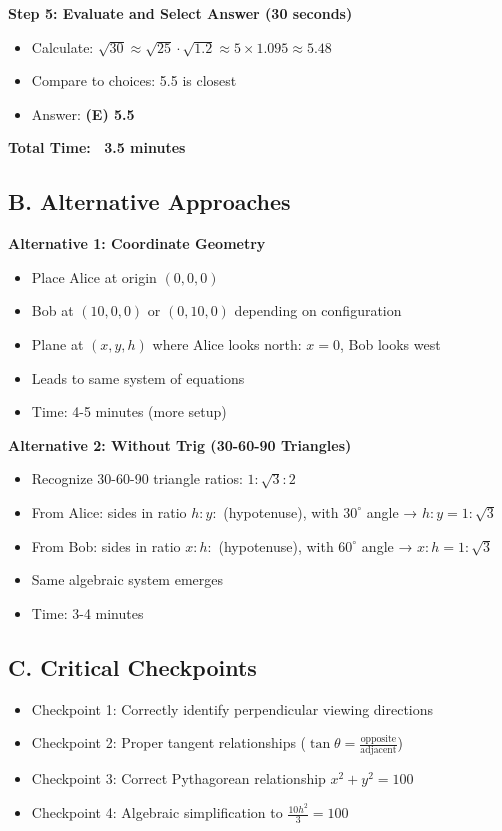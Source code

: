\documentclass[12pt]{article}
\begin{document}
\begin{roadmapbox}
\textbf{Step 5: Evaluate and Select Answer (30 seconds)}
\begin{itemize}[leftmargin=*]
    \item Calculate: $\sqrt{30} \approx \sqrt{25} \cdot \sqrt{1.2} \approx 5 \times 1.095 \approx 5.48$
    \item Compare to choices: 5.5 is closest
    \item Answer: \textbf{(E) 5.5}
\end{itemize}

\textbf{Total Time: ~3.5 minutes}

\subsection*{B. Alternative Approaches}

\textbf{Alternative 1: Coordinate Geometry}
\begin{itemize}[leftmargin=*]
    \item Place Alice at origin $(0, 0, 0)$
    \item Bob at $(10, 0, 0)$ or $(0, 10, 0)$ depending on configuration
    \item Plane at $(x, y, h)$ where Alice looks north: $x = 0$, Bob looks west
    \item Leads to same system of equations
    \item Time: 4-5 minutes (more setup)
\end{itemize}

\textbf{Alternative 2: Without Trig (30-60-90 Triangles)}
\begin{itemize}[leftmargin=*]
    \item Recognize 30-60-90 triangle ratios: $1:\sqrt{3}:2$
    \item From Alice: sides in ratio $h:y:$ (hypotenuse), with $30^\circ$ angle → $h:y = 1:\sqrt{3}$
    \item From Bob: sides in ratio $x:h:$ (hypotenuse), with $60^\circ$ angle → $x:h = 1:\sqrt{3}$
    \item Same algebraic system emerges
    \item Time: 3-4 minutes
\end{itemize}

\subsection*{C. Critical Checkpoints}
\begin{itemize}[leftmargin=*]
    \item Checkpoint 1: Correctly identify perpendicular viewing directions
    \item Checkpoint 2: Proper tangent relationships ($\tan \theta = \frac{\text{opposite}}{\text{adjacent}}$)
    \item Checkpoint 3: Correct Pythagorean relationship $x^2 + y^2 = 100$
    \item Checkpoint 4: Algebraic simplification to $\frac{10h^2}{3} = 100$
\end{itemize}


\end{roadmapbox}
\end{document}
